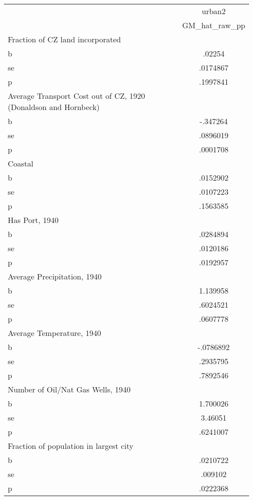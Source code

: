 \begin{tabular}{l*{1}{c}}
\toprule
                &   urban2\\
                &GM\_hat\_raw\_pp\\
\midrule
Fraction of CZ land incorporated&         \\
b               &   .02254\\
se              & .0174867\\
p               & .1997841\\
\midrule
Average Transport Cost out of CZ, 1920 (Donaldson and Hornbeck)&         \\
b               & -.347264\\
se              & .0896019\\
p               & .0001708\\
\midrule
Coastal         &         \\
b               & .0152902\\
se              & .0107223\\
p               & .1563585\\
\midrule
Has Port, 1940  &         \\
b               & .0284894\\
se              & .0120186\\
p               & .0192957\\
\midrule
Average Precipitation, 1940&         \\
b               & 1.139958\\
se              & .6024521\\
p               & .0607778\\
\midrule
Average Temperature, 1940&         \\
b               &-.0786892\\
se              & .2935795\\
p               & .7892546\\
\midrule
Number of Oil/Nat Gas Wells, 1940&         \\
b               & 1.700026\\
se              &  3.46051\\
p               & .6241007\\
\midrule
Fraction of population in largest city&         \\
b               & .0210722\\
se              &  .009102\\
p               & .0222368\\

\end{tabular}
